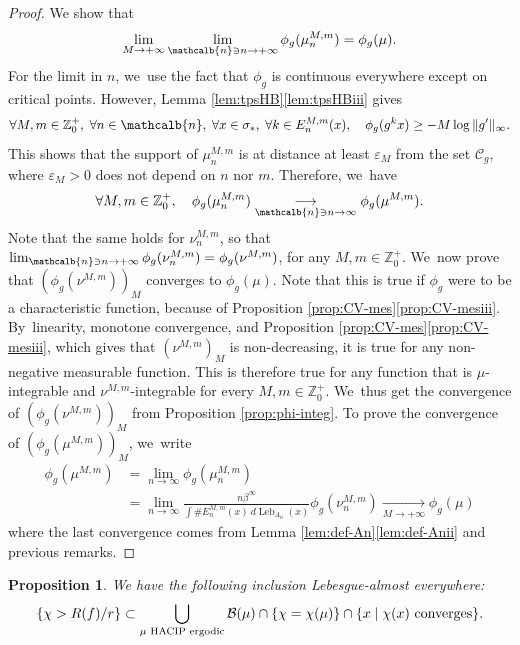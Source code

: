 \documentclass[10pt]{amsart}
\DeclareMathOperator{\Leb}{Leb}
\newcommand{\mcbn}{{\mathcalb{n}}}
\newtheorem{prop}[thm]{Proposition}
\theoremstyle{definition}
\newcommand{\bbZ}{{\mathbb{Z}}}
\begin{document}
\begin{proof}
We show that
\[
\lim_{M \to +\infty} \lim_{\mcbn \ni n \to +\infty} \phi_g(\mu_n^{M,m}) = \phi_g(\mu).
\]
For the limit in $n$, we~use the fact that $\phi_g$ is continuous everywhere except on critical points.
However, Lemma \ref{lem:tpsHB}\eqref{lem:tpsHBiii} gives
\[
\forall M,m \in \bbZ_0^+,\; \forall n \in \mcbn,\; \forall x \in \sigma_*,\; \forall k \in E_n^{M,m}(x),\quad \phi_g(g^k x) \geq -M \log \| g' \|_{\infty}.
\]
This shows that the support of $\mu_n^{M,m}$ is at distance at least $\varepsilon_M$ from the set $\mathcal{C}_g$, where $\varepsilon_M>0$ does not depend on $n$ nor $m$.
Therefore, we~have
\[
\forall M,m \in \bbZ_0^+,\quad \phi_g(\mu_n^{M,m}) \underset{\mcbn \ni n \to \infty}{\longrightarrow}
\phi_g(\mu^{M,m}).
\]
Note that the same holds for $\nu_n^{M,m}$, so that $\lim_{\mcbn \ni n \to +\infty}\phi_g(\nu_n^{M,m}) = \phi_g(\nu^{M,m})$, for any $M,m \in \bbZ_0^+$. We~now prove that $\left (\phi_g(\nu^{M,m}) \right)_M$ converges to $\phi_g(\mu)$.
Note that this is true if $\phi_g$ were to be a characteristic function, because of Proposition \ref{prop:CV-mes}\eqref{prop:CV-mesiii}. By~linearity, monotone convergence, and Proposition \ref{prop:CV-mes}\eqref{prop:CV-mesiii}, which gives that $\left (\nu^{M,m} \right)_M$ is non-decreasing, it is true for any non-negative measurable function.
This is therefore true for any function that is $\mu$-integrable and $\nu^{M,m}$-integrable for every $M,m \in \bbZ_0^+$. We~thus get the convergence of $\left (\phi_g(\nu^{M,m})\right)_M$ from Proposition \ref{prop:phi-integ}. To prove the convergence of $\left (\phi_g(\mu^{M,m})\right)_M$, we~write
\begin{align*}
\phi_g(\mu^{M,m}) &= \lim_{n \to \infty} \phi_g(\mu_n^{M,m})\\[-3pt]
&= \lim_{n \to \infty} \frac{n \beta^{\infty}}{\int \# E_n^{M,m}(x) \: d \Leb_{A_n}(x)} \phi_g(\nu_n^{M,m})
\underset{M \to +\infty}{\longrightarrow} \phi_g(\mu)
\end{align*}
where the last convergence comes from Lemma \ref{lem:def-An}\eqref{lem:def-Anii} and previous remarks.
\end{proof}

\label{ssec:bassins}

\begin{prop}
\label{prop:rec-bassins}
We have the following inclusion Lebesgue-almost everywhere:
\[
\left \{ \chi > R(f)/r \right \} \subset \bigcup_{\mu \textup{ HACIP ergodic}} \mathcal{B}(\mu) \cap \{ \chi = \chi(\mu) \} \cap \{ x \mid \chi(x) \textup{ converges} \}.
\]
\end{prop}
\end{document}
